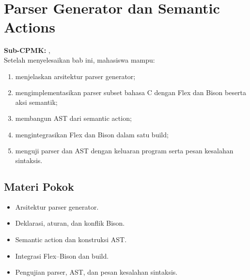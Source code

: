 \documentclass[../../main.tex]{subfiles}
\begin{document}
\chapter[Parser Generator dan Semantic Actions]{Parser Generator dan Semantic Actions}
\label{chap:parser-generator}

\begin{outcomebox}
\textbf{Sub-CPMK:} , \\[3pt]
Setelah menyelesaikan bab ini, mahasiswa mampu:
\begin{enumerate}[label=\arabic*.,leftmargin=*]
  \item menjelaskan arsitektur parser generator;
  \item mengimplementasikan parser subset bahasa C dengan Flex dan
        Bison beserta aksi semantik;
  \item membangun AST dari semantic action;
  \item mengintegrasikan Flex dan Bison dalam satu build;
  \item menguji parser dan AST dengan keluaran program serta pesan
        kesalahan sintaksis.
\end{enumerate}
\end{outcomebox}

\section*{Materi Pokok}
\begin{itemize}[leftmargin=*]
  \item Arsitektur parser generator.
  \item Deklarasi, aturan, dan konflik Bison.
  \item Semantic action dan konstruksi AST.
  \item Integrasi Flex--Bison dan build.
  \item Pengujian parser, AST, dan pesan kesalahan sintaksis.
\end{itemize}















\ifSubfilesClassLoaded{%
}{}
\end{document}
